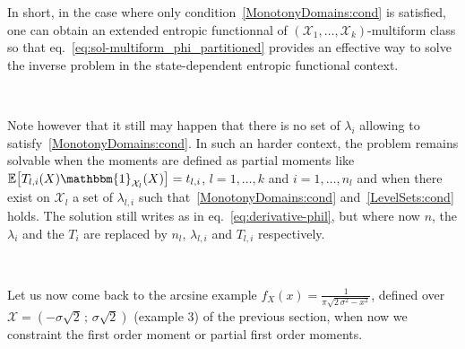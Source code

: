\documentclass[entropy,article,submit,moreauthors,pdftex]{Definitions/mdpi}
\newcommand{\SZ}[1]{{\color{blue} #1}}
\def\X{\mathcal{X}}
\def\un{\mathbbm{1}}
\newcommand{\Esp}[1]{\mathbb{E}\left[ #1 \right]}
\begin{document}
In  short,  in  the  case  where  only  condition~\ref{MonotonyDomains:cond}  is
satisfied,   one    can   obtain    an   extended   entropic    functionnal   of
$(\X_1,\ldots,\X_k)$-multiform             class             so             that
eq.~\eqref{eq:sol-multiform_phi_partitioned} provides an  effective way to solve
the inverse problem in the state-dependent entropic functional context.

\

Note  however that  it still  may happen  that there  is no  set of  $\lambda_i$
allowing to satisfy~\ref{MonotonyDomains:cond}.  In  such an harder context, the
problem remains  solvable when the moments  are defined as partial  moments like
$\Esp{T_{l,i}(X) \un_{\X_l}(X)} =  t_{l,i}$, $l = 1 ,  \ldots , k$ and $i  = 1 ,
\ldots ,  n_l$ and  when there  exist on  $\X_l$ a  set of  $\lambda_{l,i}$ such
that~\ref{MonotonyDomains:cond}  and~\ref{LevelSets:cond}  holds.  The  solution
still  writes  as in  eq.~\eqref{eq:derivative-phil},  but  where now  $n$,  the
$\lambda_i$ and the  $T_i$ are replaced by $n_l$,  $\lambda_{l,i}$ and $T_{l,i}$
respectively.

\

\SZ{Let us now come back to the arcsine example $f_X(x) = \frac{1}{\pi \sqrt{2 \,
    \sigma^2 - x^2}}$, defined  over $\X = \left( -\sigma \sqrt2  \, ; \, \sigma
  \sqrt2 \right)$} (example 3) of the previous section,
when now we constraint the first order moment or partial first order moments.
\end{document}

